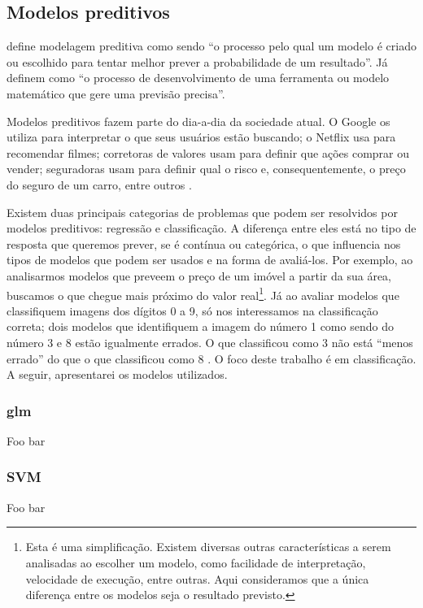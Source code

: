 \documentclass[a4paper,titlepage]{ppgi}\usepackage[]{graphicx}\usepackage[]{color}
\begin{document}
\subsection{Modelos preditivos}

 define modelagem preditiva como sendo ``o processo
pelo qual um modelo é criado ou escolhido para tentar melhor prever a
probabilidade de um resultado''. Já  definem como ``o
processo de desenvolvimento de uma ferramenta ou modelo matemático que gere uma
previsão precisa''.

Modelos preditivos fazem parte do dia-a-dia da sociedade atual. O Google os
utiliza para interpretar o que seus usuários estão buscando; o Netflix usa para
recomendar filmes; corretoras de valores usam para definir que ações comprar ou
vender; seguradoras usam para definir qual o risco e, consequentemente, o preço
do seguro de um carro, entre outros \cite{Levy2010}.

Existem duas principais categorias de problemas que podem ser resolvidos por
modelos preditivos: regressão e classificação. A diferença entre eles está no
tipo de resposta que queremos prever, se é contínua ou categórica, o que
influencia nos tipos de modelos que podem ser usados e na forma de avaliá-los.
Por exemplo, ao analisarmos modelos que preveem o preço de um imóvel a partir
da sua área, buscamos o que chegue mais próximo do valor real\footnote{Esta é
uma simplificação. Existem diversas outras características a serem analisadas
ao escolher um modelo, como facilidade de interpretação, velocidade de
execução, entre outras. Aqui consideramos que a única diferença entre os
modelos seja o resultado previsto.}. Já ao avaliar modelos que classifiquem
imagens dos dígitos 0 a 9, só nos interessamos na classificação correta; dois
modelos que identifiquem a imagem do número 1 como sendo do número 3 e 8 estão
igualmente errados. O que classificou como 3 não está ``menos errado'' do que o
que classificou como 8 \cite{Kuhn2013,Zumel2014}. O foco deste trabalho é em
classificação. A seguir, apresentarei os modelos utilizados.

\subsubsection{glm}
Foo bar

\subsubsection{SVM}
Foo bar
\end{document}
